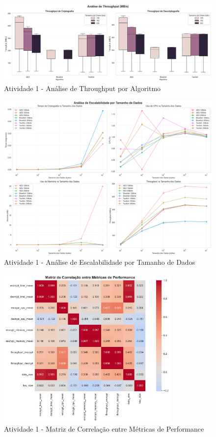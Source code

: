 \documentclass[12pt,a4paper,oneside]{article}
\begin{document}
\begin{figure}[H]
\centering
\includegraphics[width=\textwidth]{atividade1/results/throughput_analysis.png}
\caption{Atividade 1 - Análise de Throughput por Algoritmo}
\label{fig:throughput1}
\end{figure}

\begin{figure}[H]
\centering
\includegraphics[width=\textwidth]{atividade1/results/scalability_analysis.png}
\caption{Atividade 1 - Análise de Escalabilidade por Tamanho de Dados}
\label{fig:scalability1}
\end{figure}

\begin{figure}[H]
\centering
\includegraphics[width=0.8\textwidth]{atividade1/results/correlation_heatmap.png}
\caption{Atividade 1 - Matriz de Correlação entre Métricas de Performance}
\label{fig:correlation1}
\end{figure}
\end{document}
